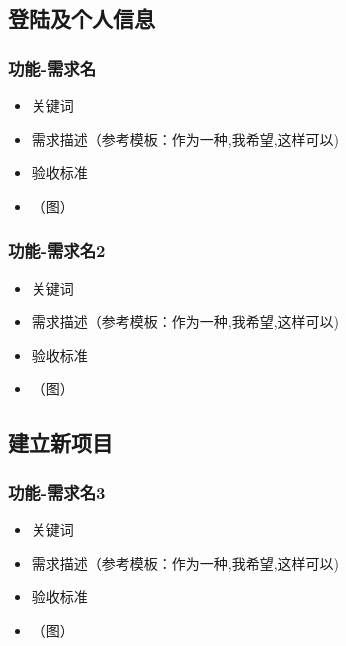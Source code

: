 \documentclass[hyperref, a4paper]{ctexart}
\providecommand{\tightlist}{%
  \setlength{\itemsep}{0pt}\setlength{\parskip}{0pt}}
\begin{document}
\hypertarget{ux767bux9646ux53caux4e2aux4ebaux4fe1ux606f}{%
\subsection{登陆及个人信息}\label{ux767bux9646ux53caux4e2aux4ebaux4fe1ux606f}}

\hypertarget{ux529fux80fd-ux9700ux6c42ux540d}{%
\subsubsection{功能-需求名}\label{ux529fux80fd-ux9700ux6c42ux540d}}

\begin{itemize}
\tightlist
\item
  关键词
\item
  需求描述（参考模板：作为一种,我希望,这样可以)
\item
  验收标准
\item
  （图）
\end{itemize}

\hypertarget{ux529fux80fd-ux9700ux6c42ux540d2}{%
\subsubsection{功能-需求名2}\label{ux529fux80fd-ux9700ux6c42ux540d2}}

\begin{itemize}
\tightlist
\item
  关键词
\item
  需求描述（参考模板：作为一种,我希望,这样可以)
\item
  验收标准
\item
  （图）
\end{itemize}

\hypertarget{ux5efaux7acbux65b0ux9879ux76ee}{%
\subsection{建立新项目}\label{ux5efaux7acbux65b0ux9879ux76ee}}

\hypertarget{ux529fux80fd-ux9700ux6c42ux540d3}{%
\subsubsection{功能-需求名3}\label{ux529fux80fd-ux9700ux6c42ux540d3}}

\begin{itemize}
\tightlist
\item
  关键词
\item
  需求描述（参考模板：作为一种,我希望,这样可以)
\item
  验收标准
\item
  （图）
\end{itemize}
\end{document}
